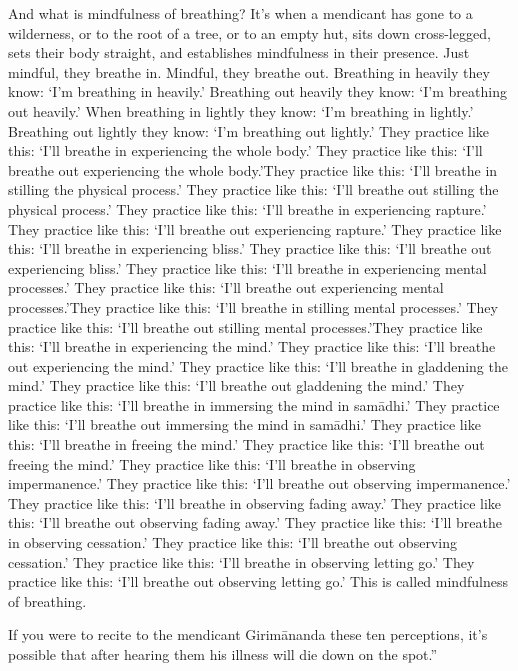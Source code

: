 \documentclass[12pt,openany]{book}%
\begin{document}
And what is mindfulness of breathing? It’s when a mendicant has gone to a wilderness, or to the root of a tree, or to an empty hut, sits down cross-legged, sets their body straight, and establishes mindfulness in their presence. Just mindful, they breathe in. Mindful, they breathe out. Breathing in heavily they know: ‘I’m breathing in heavily.’ Breathing out heavily they know: ‘I’m breathing out heavily.’ When breathing in lightly they know: ‘I’m breathing in lightly.’ Breathing out lightly they know: ‘I’m breathing out lightly.’ They practice like this: ‘I’ll breathe in experiencing the whole body.’ They practice like this: ‘I’ll breathe out experiencing the whole body.’They practice like this: ‘I’ll breathe in stilling the physical process.’ They practice like this: ‘I’ll breathe out stilling the physical process.’ They practice like this: ‘I’ll breathe in experiencing rapture.’ They practice like this: ‘I’ll breathe out experiencing rapture.’ They practice like this: ‘I’ll breathe in experiencing bliss.’ They practice like this: ‘I’ll breathe out experiencing bliss.’ They practice like this: ‘I’ll breathe in experiencing mental processes.’ They practice like this: ‘I’ll breathe out experiencing mental processes.’They practice like this: ‘I’ll breathe in stilling mental processes.’ They practice like this: ‘I’ll breathe out stilling mental processes.’They practice like this: ‘I’ll breathe in experiencing the mind.’ They practice like this: ‘I’ll breathe out experiencing the mind.’ They practice like this: ‘I’ll breathe in gladdening the mind.’ They practice like this: ‘I’ll breathe out gladdening the mind.’ They practice like this: ‘I’ll breathe in immersing the mind in \textsanskrit{samādhi}.’ They practice like this: ‘I’ll breathe out immersing the mind in \textsanskrit{samādhi}.’ They practice like this: ‘I’ll breathe in freeing the mind.’ They practice like this: ‘I’ll breathe out freeing the mind.’ They practice like this: ‘I’ll breathe in observing impermanence.’ They practice like this: ‘I’ll breathe out observing impermanence.’ They practice like this: ‘I’ll breathe in observing fading away.’ They practice like this: ‘I’ll breathe out observing fading away.’ They practice like this: ‘I’ll breathe in observing cessation.’ They practice like this: ‘I’ll breathe out observing cessation.’ They practice like this: ‘I’ll breathe in observing letting go.’ They practice like this: ‘I’ll breathe out observing letting go.’ This is called mindfulness of breathing. 

If you were to recite to the mendicant \textsanskrit{Girimānanda} these ten perceptions, it’s possible that after hearing them his illness will die down on the spot.” 
\end{document}

